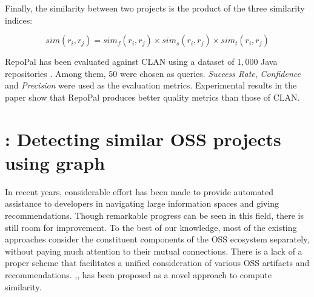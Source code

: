 Finally, the similarity between two projects is the product of the three similarity indices: %

\begin{equation} \label{eqn:RepoPalSim}
sim(r_i,r_j) = sim_{f}(r_i,r_j) \times sim_{s}(r_i,r_j) \times sim_{t}(r_i,r_j)
\end{equation}

RepoPal has been evaluated against CLAN using a dataset of $1,000$ Java repositories \cite{10.1109/SANER.2017.7884605}. Among them, $50$ were chosen as queries. {\em Success Rate}, {\em Confidence} and {\em Precision} were used as the evaluation metrics. Experimental results in the paper show that RepoPal produces better quality metrics than those of CLAN.







\section{\CrossSim: Detecting similar OSS projects using graph}

In recent years, considerable effort has been made to provide automated assistance to developers in navigating large information spaces and giving recommendations. Though remarkable progress can be seen in this field, there is still room for improvement. To the best of our knowledge, most of the existing approaches consider the constituent components of the OSS ecosystem separately, without paying much attention to their mutual connections. There is a lack of a proper scheme that facilitates a unified consideration of various OSS artifacts and recommendations. \CrossSim \cite{NDRDSEAA2018},\cite{NDD:KaRS:2018},\cite{DBLP:conf/iir/NDD013} has been proposed as a novel approach to compute similarity.
 
